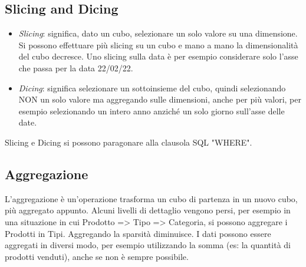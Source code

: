 \subsection{Slicing and Dicing}
\begin{itemize}
	\item \textit{Slicing}: significa, dato un cubo, selezionare un solo valore su una dimensione. Si possono effettuare più slicing su un cubo e mano a mano la dimensionalità del cubo decresce. Uno slicing sulla data è per esempio considerare solo l'asse che passa per la data 22/02/22.
	\item \textit{Dicing}: significa selezionare un sottoinsieme del cubo, quindi selezionando NON un solo valore ma aggregando sulle dimensioni, anche per più valori, per esempio selezionando un intero anno anziché un solo giorno sull'asse delle date.
\end{itemize}
Slicing e Dicing si possono paragonare alla clausola SQL "WHERE".

\subsection{Aggregazione}
L'aggregazione è un'operazione trasforma un cubo di partenza in un nuovo cubo, più aggregato appunto. Alcuni livelli di dettaglio vengono persi, per esempio in una situazione in cui Prodotto => Tipo => Categoria, si possono aggregare i Prodotti in Tipi.\newline
Aggregando la sparsità diminuisce.
I dati possono essere aggregati in diversi modo, per esempio utilizzando la somma (es: la quantità di prodotti venduti), anche se non è sempre possibile.

